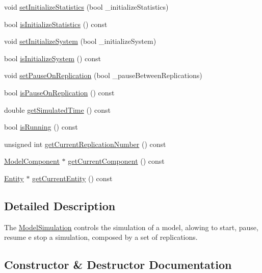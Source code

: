 \begin{DoxyCompactItemize}
\item 
void \hyperlink{class_model_simulation_a990e022cf5d9a07a1467282e7999dafb}{set\+Initialize\+Statistics} (bool \+\_\+initialize\+Statistics)
\item 
bool \hyperlink{class_model_simulation_aa4d1e58ddc7f34a6c414b72581424fea}{is\+Initialize\+Statistics} () const 
\item 
void \hyperlink{class_model_simulation_a6aff149fae4ec9be0d98772e263e9508}{set\+Initialize\+System} (bool \+\_\+initialize\+System)
\item 
bool \hyperlink{class_model_simulation_a7ad0ce011b011a12cab4e08ca9a4bb28}{is\+Initialize\+System} () const 
\item 
void \hyperlink{class_model_simulation_ad41d1cfb0e7d4fcafb8bdbdb7f4de516}{set\+Pause\+On\+Replication} (bool \+\_\+pause\+Between\+Replications)
\item 
bool \hyperlink{class_model_simulation_a96696912f5c1098843f2fe991c69136e}{is\+Pause\+On\+Replication} () const 
\item 
double \hyperlink{class_model_simulation_abd147072d362838f89d0b37e7bf16024}{get\+Simulated\+Time} () const 
\item 
bool \hyperlink{class_model_simulation_a1cf94d6c99daef9c8de567fb29c3d7fb}{is\+Running} () const 
\item 
unsigned int \hyperlink{class_model_simulation_ac0ebd4f2076307f171489baf5557e9c2}{get\+Current\+Replication\+Number} () const 
\item 
\hyperlink{class_model_component}{Model\+Component} $\ast$ \hyperlink{class_model_simulation_a84c5dc03c1869181f6cfff2f3ce7fce2}{get\+Current\+Component} () const 
\item 
\hyperlink{class_entity}{Entity} $\ast$ \hyperlink{class_model_simulation_a1b6f4ef7c6eccef2fc4ce4db2889a7c4}{get\+Current\+Entity} () const 
\end{DoxyCompactItemize}


\subsection{Detailed Description}
The \hyperlink{class_model_simulation}{Model\+Simulation} controls the simulation of a model, alowing to start, pause, resume e stop a simulation, composed by a set of replications. 

\subsection{Constructor \& Destructor Documentation}
